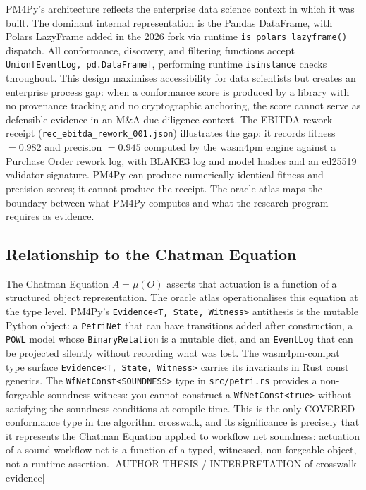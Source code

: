 PM4Py's architecture reflects the enterprise data science context in which it was built.
The dominant internal representation is the Pandas DataFrame, with Polars LazyFrame added
in the 2026 fork via runtime \texttt{is\_polars\_lazyframe()} dispatch. All conformance,
discovery, and filtering functions accept \texttt{Union[EventLog, pd.DataFrame]}, performing
runtime \texttt{isinstance} checks throughout. This design maximises accessibility for
data scientists but creates an enterprise process gap: when a conformance score is produced
by a library with no provenance tracking and no cryptographic anchoring, the score cannot
serve as defensible evidence in an M\&A due diligence context. The EBITDA rework receipt
(\texttt{rec\_ebitda\_rework\_001.json}) illustrates the gap: it records fitness $= 0.982$
and precision $= 0.945$ computed by the wasm4pm engine against a Purchase Order rework
log, with BLAKE3 log and model hashes and an ed25519 validator signature. PM4Py can
produce numerically identical fitness and precision scores; it cannot produce the receipt.
The oracle atlas maps the boundary between what PM4Py computes and what the research
program requires as evidence.

\subsection{Relationship to the Chatman Equation}
\label{sec:sources-pm4py-lineage-chatman}

The Chatman Equation $A = \mu(O)$ asserts that actuation is a function of a structured
object representation. The oracle atlas operationalises this equation at the type level.
PM4Py's \texttt{Evidence<T, State, Witness>} antithesis is the mutable Python object:
a \texttt{PetriNet} that can have transitions added after construction, a \texttt{POWL}
model whose \texttt{BinaryRelation} is a mutable dict, and an \texttt{EventLog} that can
be projected silently without recording what was lost. The wasm4pm-compat type surface
\texttt{Evidence<T, State, Witness>} carries its invariants in Rust const generics.
The \texttt{WfNetConst<SOUNDNESS>} type in \texttt{src/petri.rs} provides a non-forgeable
soundness witness: you cannot construct a \texttt{WfNetConst<true>} without satisfying
the soundness conditions at compile time. This is the only COVERED conformance type in
the algorithm crosswalk, and its significance is precisely that it represents the Chatman
Equation applied to workflow net soundness: actuation of a sound workflow net is a
function of a typed, witnessed, non-forgeable object, not a runtime assertion. [AUTHOR
THESIS / INTERPRETATION of crosswalk evidence]

